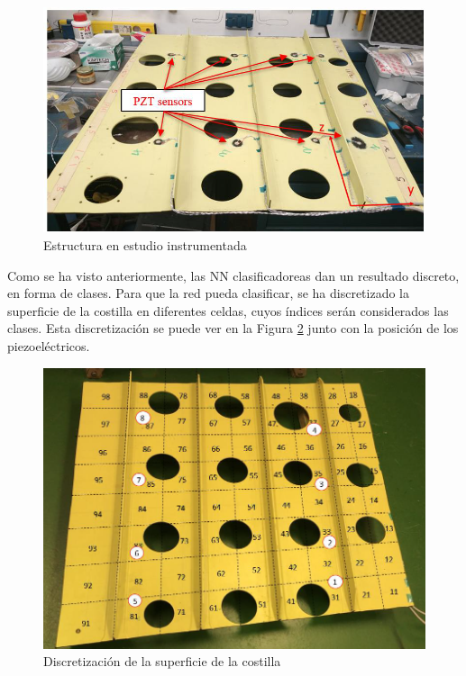 \begin{figure}[h!]
    \centering
    \includegraphics[width=125mm, angle=0]{4/Fotos/costilla_piezos.png}
    \captionsetup{justification=centering,margin=1.25cm}
    \caption{Estructura en estudio instrumentada}
    \label{fig:costilla_piezos}
\end{figure}

Como se ha visto anteriormente, las NN clasificadoreas dan un resultado discreto, en forma de clases. Para que la red pueda clasificar, se ha discretizado la superficie de la costilla en diferentes celdas, cuyos índices serán considerados las clases. Esta discretización se puede ver en la Figura \ref{fig:costilla_celdas} junto con la posición de los piezoeléctricos.

\begin{figure}[h!]
    \centering
    \includegraphics[width=125mm, angle=0]{4/Fotos/costilla_celdas.png}
    \captionsetup{justification=centering,margin=1.25cm}
    \caption{Discretización de la superficie de la costilla}
    \label{fig:costilla_celdas}
\end{figure}

